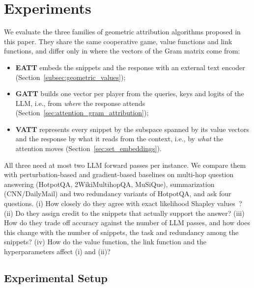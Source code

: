 \section{Experiments}
\label{sec:experiments}

We evaluate the three families of geometric attribution algorithms proposed in this paper. They share the same cooperative game, value functions and link functions, and differ only in where the vectors of the Gram matrix come from:
\begin{itemize}
    \item \textbf{EATT} embeds the snippets and the response with an external text encoder (Section~\ref{subsec:geometric_values});
    \item \textbf{GATT} builds one vector per player from the queries, keys and logits of the LLM, i.e., from \emph{where} the response attends (Section~\ref{sec:attention_gram_attribution});
    \item \textbf{VATT} represents every snippet by the subspace spanned by its value vectors and the response by what it reads from the context, i.e., by \emph{what} the attention moves (Section~\ref{sec:set_embeddings}).
\end{itemize}
All three need at most two LLM forward passes per instance. We compare them with perturbation-based and gradient-based baselines on multi-hop question answering (HotpotQA, 2WikiMultihopQA, MuSiQue), summarization (CNN/DailyMail) and two redundancy variants of HotpotQA, and ask four questions. (i) How closely do they agree with exact likelihood Shapley values~\cite{nematov2025source}? (ii) Do they assign credit to the snippets that actually support the answer? (iii) How do they trade off accuracy against the number of LLM passes, and how does this change with the number of snippets, the task and redundancy among the snippets? (iv) How do the value function, the link function and the hyperparameters affect (i) and (ii)?

\subsection{Experimental Setup}
\label{subsec:exp_setup}

